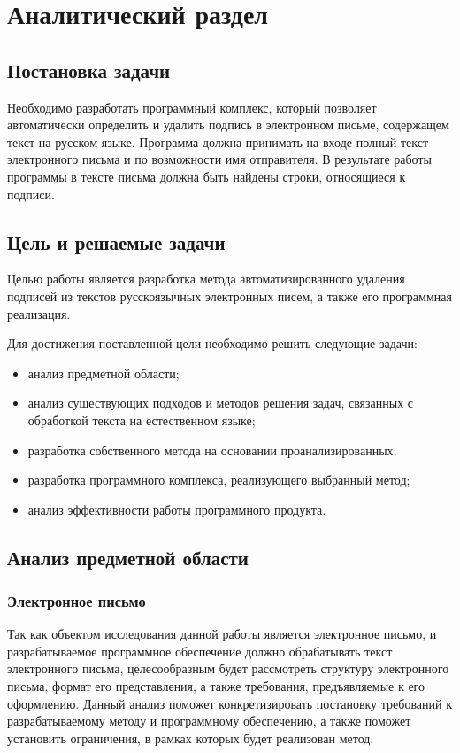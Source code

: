 \chapter{Аналитический раздел}
\label{cha:analysis}

\section{Постановка задачи}
Необходимо разработать программный комплекс, который позволяет автоматически определить и удалить подпись в электронном письме, содержащем текст на русском языке. Программа должна принимать на входе полный текст электронного письма и по возможности имя отправителя. В результате работы программы в тексте письма должна быть найдены строки, относящиеся к подписи. 
\section{Цель и решаемые задачи}
Целью работы является разработка метода автоматизированного удаления подписей из текстов русскоязычных электронных писем, а также его программная реализация.

Для достижения поставленной цели необходимо решить следующие задачи:
\begin{itemize}
	\item анализ предметной области;
	\item анализ существующих подходов и методов решения задач, связанных с обработкой текста на естественном языке;
	\item разработка собственного метода на основании проанализированных;
	\item разработка программного комплекса, реализующего выбранный метод;
	\item анализ эффективности работы программного продукта.
\end{itemize}
\newpage
\section{Анализ предметной области}

\subsection{Электронное письмо}

Так как объектом исследования данной работы является электронное письмо, и разрабатываемое программное обеспечение должно обрабатывать текст электронного письма, целесообразным будет рассмотреть структуру электронного письма, формат его представления,  а также требования, предъявляемые к его оформлению. Данный анализ поможет конкретизировать постановку требований к разрабатываемому методу и программному обеспечению, а также поможет установить ограничения, в рамках которых будет реализован метод.


